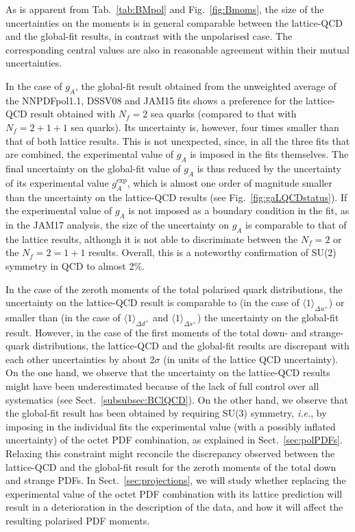 As is apparent from Tab.~\ref{tab:BMpol} and Fig.~\ref{fig:Bmoms}, the size of 
the uncertainties on the moments is in general comparable between the 
lattice-QCD and the global-fit results, in contrast  with the unpolarised case.
%
The corresponding central values are also in reasonable agreement within their
mutual uncertainties.

In the case of $g_A$, the global-fit result obtained from the unweighted 
average of the NNPDFpol1.1, DSSV08 and JAM15 fits shows a preference for the
lattice-QCD result obtained with $N_f=2$ sea quarks (compared to that with 
$N_f=2+1+1$ sea quarks).
%
Its uncertainty is, however, four times smaller than that of both lattice results.
%
This is not unexpected, since, in all the three fits that are combined, the 
experimental value of $g_A$ is imposed in the fits themselves.
%
The final uncertainty on the global-fit value of $g_A$ is thus reduced by 
the uncertainty of its experimental value $g_A^\text{exp}$, which is almost
one order of magnitude smaller than the uncertainty on the lattice-QCD results
(see Fig.~\ref{fig:gaLQCDstatus}).
%
If the experimental value of $g_A$ is not imposed as a boundary condition in 
the fit, as in the JAM17 analysis, the size of the uncertainty on $g_A$ is 
comparable to that of the lattice results, although it is not able to 
discriminate between the $N_f=2$ or the $N_f=2=1+1$ results.
%
Overall, this is a noteworthy confirmation of SU(2) symmetry in QCD to
almost 2\%.

In the case of the zeroth moments of the total polarised quark distributions,
the uncertainty on the lattice-QCD result is comparable to (in the case
of $\langle 1 \rangle_{\Delta u^+}$) or smaller than (in the case
of $\langle 1 \rangle_{\Delta d^+}$ and $\langle 1 \rangle_{\Delta s^+}$)
the uncertainty on the global-fit result.
%
However, in the case of the first moments of the total down- and strange-quark 
distributions, the lattice-QCD and the global-fit results are discrepant
with each other uncertainties by about 2$\sigma$ (in units of the
lattice QCD uncertainty).
%
On the one hand, we observe that the uncertainty on the lattice-QCD results 
might have been underestimated because of the lack of full control over
all systematics (see Sect.~\ref{subsubsec:BClQCD}).
%
On the other hand, we observe that the global-fit result has been obtained
by requiring SU(3) symmetry, {\it i.e.}, by imposing in the individual fits 
the experimental value (with a possibly inflated uncertainty) of the octet PDF 
combination, as explained in Sect.~\ref{sec:polPDFs}.
%
Relaxing this constraint might reconcile the discrepancy observed between 
the lattice-QCD and the global-fit result for the zeroth moments of the 
total down and strange PDFs.
%
In Sect.~\ref{sec:projections}, we will study whether replacing the experimental
value of the octet PDF combination with its lattice prediction
will result in a deterioration in the description of the data, and how it will
affect the resulting polarised PDF moments.
 
